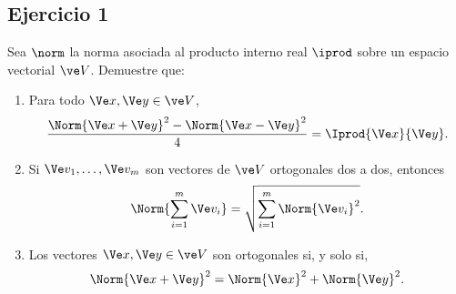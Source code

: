 


	\subsection*{Ejercicio 1}
	Sea $\norm$ la norma asociada al producto interno real $\iprod$ sobre un espacio vectorial $\ve V$. Demuestre que:
	\begin{enumerate}
		\item Para todo $\Ve x,\Ve y\in \ve V$,
		\[ \frac{\Norm{\Ve x+\Ve y}^2-\Norm{\Ve x-\Ve y}^2}{4} = \Iprod{\Ve x}{\Ve y}.  \]
		\item Si $\Ve v_1,\dots,\Ve v_m$ son vectores de $\ve V$ ortogonales dos a dos, entonces
		\[ \Norm{\sum_{i=1}^{m} \Ve v_i} = \sqrt{\sum_{i=1}^{m}\Norm{\Ve v_i}^2}. \]
		\item Los vectores $\Ve x,\Ve y\in\ve V$ son ortogonales si, y solo si,
		\[ \Norm{\Ve x+\Ve y}^2 = \Norm{\Ve x}^2+\Norm{\Ve y}^2. \]
	\end{enumerate}
